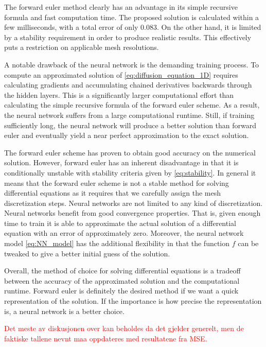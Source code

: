 \documentclass[12pt]{extarticle}
\begin{document}
\par The forward euler method clearly has an advantage in its simple recursive formula and fast computation time. The proposed solution is calculated within a few milliseconds, with a total error of only 0.083. On the other hand, it is limited by a stability requirement in order to produce realistic results. This effectively puts a restriction on applicable mesh resolutions.

\par A notable drawback of the neural network is the demanding training process. To compute an approximated solution of \eqref{eq:diffusion_equation_1D} requires calculating gradients and accumulating chained derivatives backwards through the hidden layers. This is a significantly larger computational effort than calculating the simple recursive formula of the forward euler scheme. As a result, the neural network suffers from a large computational runtime. Still, if training sufficiently long, the neural network will produce a better solution than forward euler and eventually yield a near perfect approximation to the exact solution. 

\par The forward euler scheme has proven to obtain good accuracy on the numerical solution. However, forward euler has an inherent disadvantage in that it is conditionally unstable with stability criteria given by \eqref{eq:stability}. In general it means that the forward euler scheme is not a stable method for solving differential equations as it requires that we carefully assign the mesh discretization steps. Neural networks are not limited to any kind of discretization. Neural networks benefit from good convergence properties. That is, given enough time to train it is able to approximate the actual solution of a differential equation with an error of approximately zero. Moreover, the neural network model \eqref{eq:NN_model} has the additional flexibility in that the function $f$ can be tweaked to give a better initial guess of the solution. 
\par Overall, the method of choice for solving differential equations is a tradeoff between the accuracy of the approximated solution and the computational runtime. Forward euler is definitely the desired method if we want a quick representation of the solution. If the importance is how precise the representation is, a neural network is a better choice.

\textcolor{red}{Det meste av diskusjonen over kan beholdes da det gjelder generelt, men de faktiske tallene nevnt maa oppdateres med resultatene fra MSE.}
\end{document}
